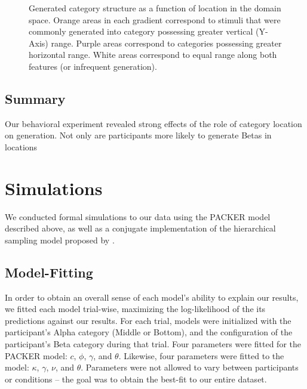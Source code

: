 \documentclass[10pt,letterpaper]{article}
\newcommand\inputpgf[2]{{
\let\pgfimageWithoutPath\pgfimage
\renewcommand{\pgfimage}[2][]{\pgfimageWithoutPath[##1]{#1/##2}}

}}
\begin{document}
\begin{figure}[ht!]
    \begin{center}
    \inputpgf{figs/}{range-diff-gradient.pgf}
    \caption{Generated category structure as a function of location in the domain space. Orange areas in each gradient correspond to stimuli that were commonly generated into category possessing greater vertical (Y-Axis) range. Purple areas correspond to categories possessing greater horizontal range. White areas correspond to equal range along both features (or infrequent generation).}
    \label{fig:range-diff-gradient}
    \end{center}
\end{figure}

\subsection{Summary}

Our behavioral experiment revealed strong effects of the role of category location on generation. Not only are participants more likely to generate Betas in locations

\section{Simulations}

We conducted formal simulations to our data using the PACKER model described above, as well as a conjugate implementation of the hierarchical sampling model proposed by \citet{jern2013probabilistic}.


\subsection{Model-Fitting}
In order to obtain an overall sense of each model's ability to explain our results, we fitted each model trial-wise, maximizing the log-likelihood of the its predictions against our results. For each trial, models were initialized with the participant's Alpha category (Middle or Bottom), and the configuration of the participant's Beta category during that trial. Four parameters were fitted for the PACKER model: $c$, $\phi$, $\gamma$, and $\theta$. Likewise, four parameters were fitted to the \cite{jern2013probabilistic} model: $\kappa$, $\gamma$, $\nu$, and $\theta$. Parameters were not allowed to vary between participants or conditions -- the goal was to obtain the best-fit to our entire dataset.
\end{document}
